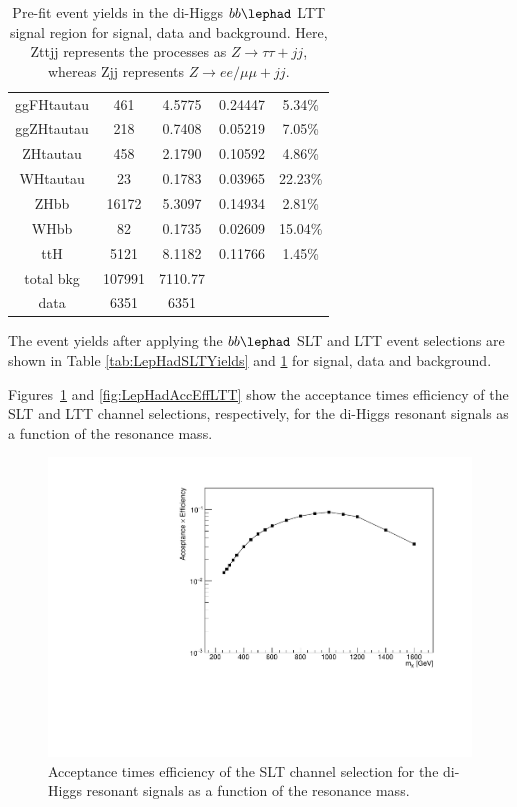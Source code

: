 \begin{table}
\begin{tabular}{|c|c|c|c|c|}
	ggFHtautau  & 461   &	4.5775       &	0.24447  &	5.34\% \\
	ggZHtautau  & 218   &	0.7408       &	0.05219  &	7.05\% \\
	ZHtautau      & 458   &	2.1790       &	0.10592  &	4.86\% \\
	WHtautau     & 23     &	0.1783       &	0.03965  &	22.23\% \\
 	ZHbb            & 16172&	5.3097       &	0.14934 &	 	2.81\% \\
	WHbb           & 82     &	0.1735       &	0.02609 &		15.04\% \\
	ttH                 & 5121 &	8.1182       &	0.11766 &		1.45\% \\
	\hline

        \hline
	total bkg 	&	107991  &	   7110.77 &  & \\		
	data		& 	6351      &    6351 	&  &   \\
	\hline
	\hline

    \end{tabular}
    \caption{Pre-fit event yields in the di-Higgs $bb\lephad$ LTT signal region for signal, data and background. Here, Zttjj represents the processes as $Z\rightarrow\tau\tau + jj$, 
    whereas Zjj represents  $Z\rightarrow ee/\mu\mu + jj$.}
    \label{tab:LepHadLTTYields}
\end{table}

The event yields after applying the $bb\lephad$ SLT and LTT event selections are shown in Table \ref{tab:LepHadSLTYields} and \ref{tab:LepHadLTTYields} for signal, data and background. 

Figures~\ref{fig:LepHadAccEffSLT} and \ref{fig:LepHadAccEffLTT} show the acceptance times efficiency of the \lephad SLT and LTT channel selections, respectively, for the di-Higgs resonant signals as a function of the resonance mass. \begin{figure}
\centering
\includegraphics[width=.65\textwidth]{figures/selection/LepHad_HH/SLT_AccEff.pdf}
\caption{Acceptance times efficiency of the \lephad SLT channel selection for the di-Higgs resonant signals as a function of the resonance mass.}
\label{fig:LepHadAccEffSLT}
\end{figure}

